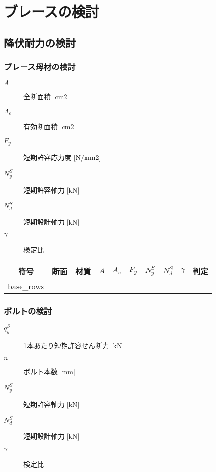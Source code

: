 \documentclass[a4paper,xelatex,ja=standard]{bxjsarticle}
\begin{document}
\section*{ブレースの検討}

\subsection*{降伏耐力の検討}

\subsubsection*{ブレース母材の検討}

\begin{description}
    \item[$A$] 全断面積 [cm2]
    \item[$A_e$] 有効断面積 [cm2]
    \item[$F_y$] 短期許容応力度 [N/mm2]
    \item[$N_y^S$] 短期許容軸力 [kN]
    \item[$N_d^S$] 短期設計軸力 [kN]
    \item[$\gamma$] 検定比
\end{description}

\begin{table}[htbp]
    \begin{tabular}{cccccccccc}
    \toprule
        符号 & 断面 & 材質 & $A$ & $A_e$ & $F_y$ & $N_y^S$ & $N_d^S$ & $\gamma$ & 判定 \\ \midrule
        {{base_rows}}
        \bottomrule
    \end{tabular}
\end{table}

\FloatBarrier

\subsubsection*{ボルトの検討}

\begin{description}
    \item[$q_y^S$] 1本あたり短期許容せん断力 [kN]
    \item[$n$] ボルト本数 [mm]
    \item[$N_y^S$] 短期許容軸力 [kN]
    \item[$N_d^S$] 短期設計軸力 [kN]
    \item[$\gamma$] 検定比
\end{description}
\end{document}
